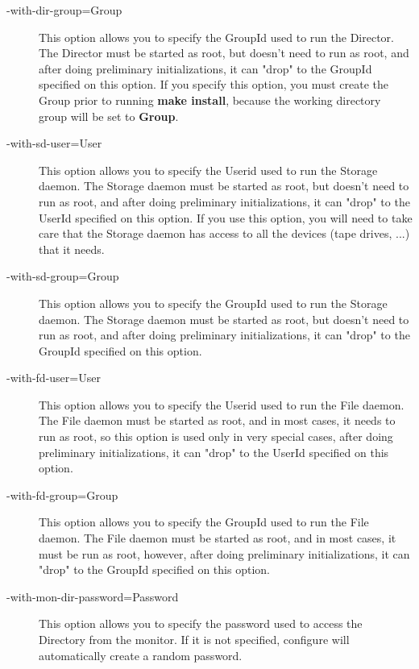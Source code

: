 \begin{description}
\item [ {-}{\-}with-dir-group=\lt{}Group\gt{} ]
   This option allows you to specify the GroupId used to  run the Director. The
   Director must be started as root, but  doesn't need to run as root, and  after
   doing preliminary initializations, it can "drop"  to the GroupId specified
   on this option. 
   If you specify this option, you must
   create the Group prior to running {\bf make install}, because the
   working directory group will be set to {\bf Group}.

\item [ {-}{\-}with-sd-user=\lt{}User\gt{} ]
   This option allows you to specify the Userid used to  run the Storage daemon.
   The Storage daemon must be started as root, but  doesn't need to run as root,
   and  after doing preliminary initializations, it can "drop"  to the UserId
   specified on this option. If you use this option,  you will need to take care
   that the Storage daemon has access  to all the devices (tape drives, ...) that
   it needs. 

\item [ {-}{\-}with-sd-group=\lt{}Group\gt{} ]
   This option allows you to specify the GroupId used to  run the Storage daemon.
   The Storage daemon must be started as root, but  doesn't need to run as root,
   and  after doing preliminary initializations, it can "drop"  to the GroupId
   specified on this option. 

\item [ {-}{\-}with-fd-user=\lt{}User\gt{} ]
   This option allows you to specify the Userid used to  run the File daemon. The
   File daemon must be started as root,  and in most cases, it needs to run as
   root, so this option is  used only in very special cases,  after doing
   preliminary initializations, it can "drop"  to the UserId specified on this
   option. 

\item [ {-}{\-}with-fd-group=\lt{}Group\gt{} ]
   This option allows you to specify the GroupId used to  run the File daemon.
   The File daemon must be started as root, and  in most cases, it must be run as
   root, however,  after doing preliminary initializations, it can "drop"  to
   the GroupId specified on this option. 

\item [ {-}{\-}with-mon-dir-password=\lt{}Password\gt{}]
   This option allows you to specify the password used to  access the Directory
   from the monitor.  If it is not specified, configure will
   automatically create a random  password.  


\end{description}
